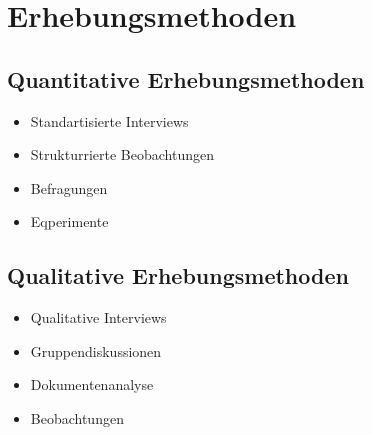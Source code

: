 \documentclass[../main.tex]{subfiles}
\begin{document}
    \section{Erhebungsmethoden}
        \subsection{Quantitative Erhebungsmethoden}
            \begin{itemize}
                \item Standartisierte Interviews
                \item Strukturrierte Beobachtungen
                \item Befragungen
                \item Eqperimente
            \end{itemize}
        
        \subsection{Qualitative Erhebungsmethoden}
            \begin{itemize}
                \item Qualitative Interviews
                \item Gruppendiskussionen
                \item Dokumentenanalyse
                \item Beobachtungen
            \end{itemize}
    
\end{document}
